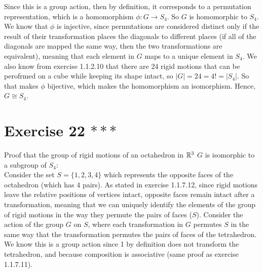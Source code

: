 \documentclass{article}
\begin{document}
    Since this is a group action, then by definition,
    it corresponds to a permutation representation,
    which is a homomorphism $\phi: G \to S_4$.
    So $G$ is homomorphic to $S_4$. \\
    We know that $\phi$ is injective, since permutations are considered 
    distinct only if the result of their transformation places the
    diagonals to different places (if all of the diagonals are mapped
    the same way, then the two transformations are equivalent),
    meaning that each element in $G$ maps to a unique element in $S_4$.
    We also know from exercise 1.1.2.10 that there are 24 rigid
    motions that can be perofrmed on a cube while keeping its shape intact,
    so $|G| = 24 = 4! = |S_4|$.
    So that makes $\phi$ bijective, which makes the homomorphism
    an isomorphism.
    Hence, $G \cong S_4$.

    
    \section*{Exercise 22 $***$}
    Proof that the group of rigid motions of an octahedron in $\mathbb{R}^3$ $G$
    is isomorphic to a subgroup of $S_4$: \\
    Consider the set $S = \{1, 2, 3 ,4\}$ which represents the opposite
    faces of the octahedron (which has 4 pairs).
    As stated in exercise 1.1.7.12,
    since rigid motions leave the relative positions of vertices intact,
    opposite faces remain intact after a transformation,
    meaning that we can uniquely identify the elements of the group of
    rigid motions in the way they permute the pairs of faces ($S$).
    Consider the action of the group $G$ on $S$,
    where each transformation in $G$ permutes $S$ in the same way that
    the transformation permutes the pairs of faces of the tetrahedron.
    We know this is a group action since 1 by definition does not transform 
    the tetrahedron,
    and because composition is associative
    (same proof as exercise 1.1.7.11). \\
\end{document}
